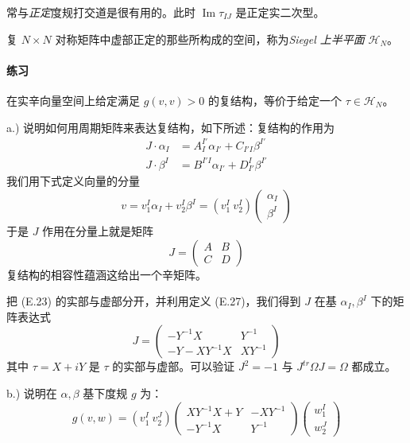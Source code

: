 常与\emph{正定}度规打交道是很有用的。此时 $\operatorname{Im}\tau_{IJ}$ 是正定实二次型。

\begin{definition}
  复 $N\times N$ 对称矩阵中虚部正定的那些所构成的空间，称为\emph{Siegel 上半平面}
  $\mathcal{H}_N$。
\end{definition}

\paragraph{练习}
在实辛向量空间上给定满足 $g(v,v)>0$ 的复结构，等价于给定一个 $\tau\in\mathcal{H}_N$。

a.) 说明如何用周期矩阵来表达复结构，如下所述：复结构的作用为
\begin{equation}
\begin{aligned}
  J\cdot\alpha_I &= A^{I'}_{I}\alpha_{I'}+C_{I'I}\beta^{I'}\\
  J\cdot\beta^I &= B^{I'I}\alpha_{I'}+D^{I}_{I'}\beta^{I'}
\end{aligned}
\tag{E.27}
\label{eq:E.27}
\end{equation}
我们用下式定义向量的分量
\begin{equation}
  v = v_1^I\alpha_I+v_2^I\beta^I
  = \left(v_1^I\ v_2^I\right)\begin{pmatrix}\alpha_I\\ \beta^I\end{pmatrix}
  \tag{E.28}
  \label{eq:E.28}
\end{equation}
于是 $J$ 作用在分量上就是矩阵
\begin{equation}
  J = \begin{pmatrix} A & B\\ C & D\end{pmatrix}
  \tag{E.29}
  \label{eq:E.29}
\end{equation}
复结构的相容性蕴涵这给出一个辛矩阵。

把 (E.23) 的实部与虚部分开，并利用定义 (E.27)，我们得到 $J$ 在基 $\alpha_I,\beta^I$ 下的矩阵表达式
\begin{equation}
  J = \begin{pmatrix}
    -Y^{-1}X & Y^{-1}\\
    -Y-XY^{-1}X & XY^{-1}
  \end{pmatrix}
  \tag{E.30}
  \label{eq:E.30}
\end{equation}
其中 $\tau=X+iY$ 是 $\tau$ 的实部与虚部。可以验证 $J^2=-1$ 与 $J^{tr}\Omega J=\Omega$ 都成立。

b.) 说明在 $\alpha,\beta$ 基下度规 $g$ 为：
\begin{equation}
  g(v,w) = \left(v_1^I\ v_2^J\right)
  \begin{pmatrix}
    XY^{-1}X+Y & -XY^{-1}\\
    -Y^{-1}X & Y^{-1}
  \end{pmatrix}
  \begin{pmatrix} w_1^I\\ w_2^J\end{pmatrix}
  \tag{E.31}
  \label{eq:E.31}
\end{equation}

